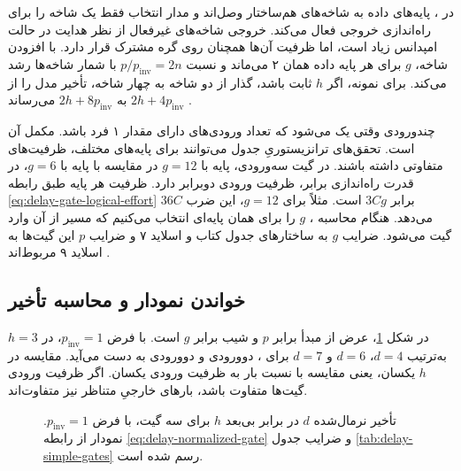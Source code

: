 در ، پایه‌های داده به شاخه‌های هم‌ساختار وصل‌اند و
مدار انتخاب فقط یک شاخه را برای راه‌اندازی خروجی فعال می‌کند.
خروجی شاخه‌های غیرفعال از نظر هدایت در حالت امپدانس زیاد است،
اما ظرفیت  آن‌ها همچنان روی گره مشترک قرار دارد.
با افزودن شاخه، \(g\) برای هر پایه داده همان ۲ می‌ماند و
نسبت \(p/p_{\mathrm{inv}}=2n\) با شمار شاخه‌ها رشد می‌کند.
برای نمونه، اگر \(h\) ثابت باشد، گذار از دو شاخه به چهار شاخه،
تأخیر مدل را از \(2h+4p_{\mathrm{inv}}\) به \(2h+8p_{\mathrm{inv}}\)
می‌رساند \cite[شکل  و جدول‌های 
و ]{weste}\cite[اسلایدهای ۷ و ۹]{logicaleffortslides}.

 چندورودی وقتی یک می‌شود که تعداد ورودی‌های دارای مقدار ۱ فرد باشد.
 مکمل آن است. تحقق‌های ترانزیستوریِ جدول می‌توانند
برای پایه‌های مختلف، ظرفیت‌های متفاوتی داشته باشند. در گیت
سه‌ورودی، پایه با \(g=12\) در مقایسه با پایه با \(g=6\)،
در قدرت راه‌اندازی برابر، ظرفیت ورودی دوبرابر دارد. ظرفیت هر
پایه طبق رابطه \eqref{eq:delay-gate-logical-effort} برابر \(3Cg\)
است. مثلاً برای \(g=12\)، این ضرب \(36C\) می‌دهد. هنگام محاسبه
، \(g\) را برای همان پایه‌ای انتخاب می‌کنیم
که مسیر از آن وارد گیت می‌شود. ضرایب \(g\) به ساختارهای جدول
 کتاب و اسلاید ۷ و ضرایب \(p\) این گیت‌ها به
اسلاید ۹ مربوط‌اند \cite[صفحه ۱۵۶]{weste}
\cite[اسلایدهای ۷ و ۹]{logicaleffortslides}.

\subsection{خواندن نمودار و محاسبه تأخیر }
\label{sec:delay-fo4}

در شکل \ref{fig:delay-gate-comparison}، عرض از مبدأ برابر \(p\)
و شیب برابر \(g\) است. با فرض \(p_{\mathrm{inv}}=1\)،
در \(h=3\) به‌ترتیب \(d=4\)، \(d=6\) و \(d=7\) برای
،  دوورودی و  دوورودی
به دست می‌آید. مقایسه در \(h\) یکسان، یعنی مقایسه با نسبت بار
به ظرفیت ورودی یکسان. اگر ظرفیت ورودی گیت‌ها متفاوت باشد،
بارهای خارجیِ متناظر نیز متفاوت‌اند.

\begin{figure}[htbp]
  \centering
  
  \caption{تأخیر نرمال‌شده \(d\) در برابر  بی‌بعد
  \(h\) برای سه گیت، با فرض \(p_{\mathrm{inv}}=1\).
  نمودار از رابطه \eqref{eq:delay-normalized-gate} و ضرایب
  جدول \ref{tab:delay-simple-gates} رسم شده است.}
  \label{fig:delay-gate-comparison}
\end{figure}


